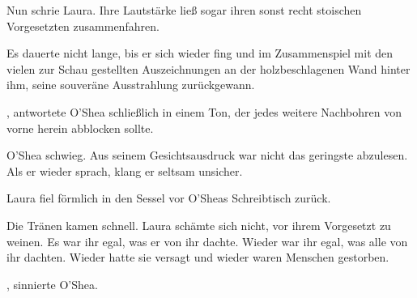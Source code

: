 \par

 Nun schrie Laura. Ihre Lautstärke ließ sogar ihren sonst recht stoischen Vorgesetzten zusammenfahren.

\par

Es dauerte nicht lange, bis er sich wieder fing und im Zusammenspiel mit den vielen zur Schau gestellten Auszeichnungen an der holzbeschlagenen Wand hinter ihm, seine souveräne Ausstrahlung zurückgewann.

\par

, antwortete O'Shea schließlich in einem Ton, der jedes weitere Nachbohren von vorne herein abblocken sollte. 

\par


\par

O'Shea schwieg. Aus seinem Gesichtsausdruck war nicht das geringste abzulesen. Als er wieder sprach, klang er seltsam unsicher. 

\par

Laura fiel förmlich in den Sessel vor O'Sheas Schreibtisch zurück. 

\par

Die Tränen kamen schnell. Laura schämte sich nicht, vor ihrem Vorgesetzt zu weinen. Es war ihr egal, was er von ihr dachte. Wieder war ihr egal, was alle von ihr dachten. Wieder hatte sie versagt und wieder waren Menschen gestorben.

\par

, sinnierte O'Shea. 

\par

